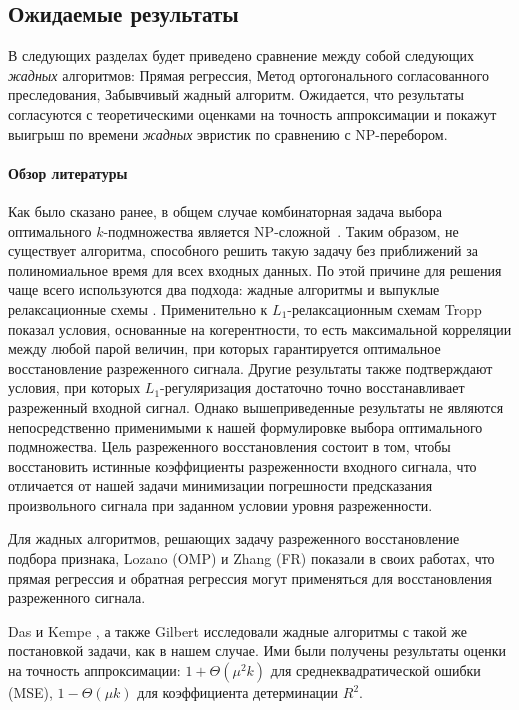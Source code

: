 \documentclass[preprint,12pt]{elsarticle}
\begin{document}
\subsection{Ожидаемые результаты}
В следующих разделах будет приведено сравнение между собой следующих \textit{жадных} алгоритмов: Прямая регрессия, Метод ортогонального согласованного преследования, Забывчивый жадный алгоритм. Ожидается, что результаты согласуются с теоретическими оценками на точность аппроксимации и покажут выигрыш по времени \textit{жадных} эвристик по сравнению с NP-перебором.

\paragraph{Обзор литературы}

Как было сказано ранее, в общем случае комбинаторная задача выбора оптимального $k$-подмножества является NP-сложной~\cite{das2011submodular}. Таким образом, не существует алгоритма, способного решить такую задачу без приближений за полиномиальное время для всех входных данных. По этой причине для решения чаще всего используются два подхода: жадные алгоритмы \cite{miller2002subset, tropp2004greed, gilbert2003approximation} и выпуклые релаксационные схемы \cite{obozinski2012convex, tibshirani1996regression, candes2006stable}. Применительно к $L_1$-релаксационным схемам Tropp \cite{tropp2006just} показал условия, основанные на когерентности, то есть максимальной корреляции между любой парой величин, при которых гарантируется оптимальное восстановление разреженного сигнала. Другие результаты \cite{zhou2009thresholding} также подтверждают условия, при которых $L_1$-регуляризация достаточно точно восстанавливает разреженный входной сигнал. Однако вышеприведенные результаты не являются непосредственно применимыми к
нашей формулировке выбора оптимального   подмножества. Цель разреженного восстановления состоит в том, чтобы восстановить истинные коэффициенты
разреженности входного сигнала, что отличается от нашей задачи минимизации погрешности предсказания произвольного сигнала при заданном условии
уровня разреженности.

Для жадных алгоритмов, решающих задачу разреженного восстановление подбора признака, Lozano \cite{swirszcz2009grouped} (OMP) и Zhang \cite{zhang2009consistency} (FR) показали в своих работах, что прямая регрессия и обратная регрессия могут применяться для восстановления разреженного сигнала. 

Das и Kempe \cite{das2011submodular}, а также Gilbert \cite{gilbert2003approximation} исследовали жадные алгоритмы с такой же постановкой задачи, как в нашем случае. Ими были получены результаты оценки на точность аппроксимации: $1+\Theta\left(\mu^{2} k\right)$ для среднеквадратической ошибки (MSE), $1-\Theta(\mu k)$ для коэффициента детерминации $R^2$.
\end{document}
